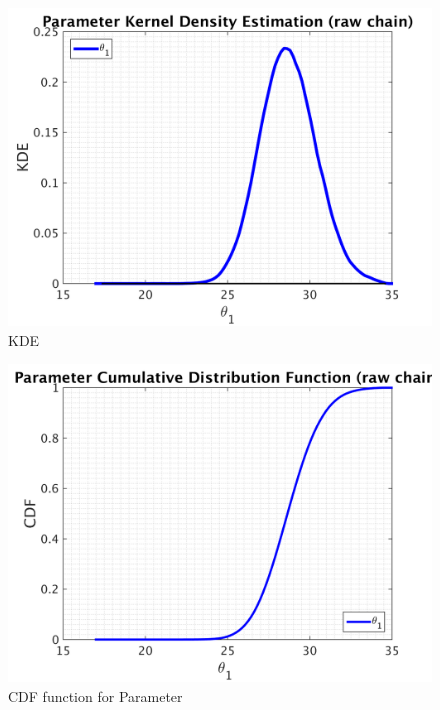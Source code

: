 \begin{figure}[H]
  
  \centering
   \includegraphics[scale=0.75]{53_results/output_1000/simple_ip_kde_raw}
   \caption{ KDE }
\end{figure}

\begin{figure}[H]
  
  \centering
   \includegraphics[scale=0.75]{53_results/output_1000/simple_ip_cdf_raw}
   \caption{CDF function for Parameter }
\end{figure}



